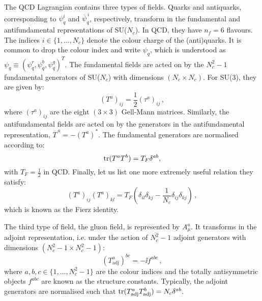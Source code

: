 \documentclass[main.tex]{subfiles}
\begin{document}
The QCD Lagrangian contains three types of fields. Quarks and antiquarks, corresponding to $\psi_q^i$ and $\overline{\psi}_q^{\,i}$, respectively, transform in the fundamental and antifundamental representations of SU($N_c$). In QCD, they have $n_f = 6$ flavours. The indices $i \in \{1,\ldots,N_c\}$ denote the colour charge of the (anti)quarks. It is common to drop the colour index and write $\psi_q$, which is understood as $\psi_q \equiv \left(\psi_q^r, \psi_q^b, \psi_q^g \right)^T$. The fundamental fields are acted on by the $N_c^2-1$ fundamental generators of SU($N_c$) with dimensions $(N_c \times N_c)$. For SU(3), they are given by:
\begin{equation}
    (T^a)_{ij} = \frac{1}{2} (\tau^a)_{ij}\,,
\end{equation}
where $(\tau^a)_{ij}$ are the eight $(3 \times 3)$ Gell-Mann matrices. Similarly, the antifundamental fields are acted on by the generators in the antifundamental representation, $\overline{T}^{\,a} = -\left(T^a\right)^\ast$. The fundamental generators are normalised according to:
\begin{equation}
    \operatorname{\rm tr} (T^aT^b) = T_F \delta^{ab},
\end{equation}
with $T_F = \frac{1}{2}$ in QCD. Finally, let us list one more extremely useful relation they satisfy:
\begin{equation} \label{eq:fierzcolour}
    (T^a)_{ij} (T^a)_{kl} = T_F \left( \delta_{il} \delta_{kj} - \frac{1}{N_c} \delta_{ij} \delta_{kj} \right)\,,
\end{equation}
which is known as the Fierz identity.

The third type of field, the gluon field, is represented by $A^a_\mu$. It transforms in the adjoint representation, i.e. under the action of $N_c^2-1$ adjoint generators with dimensions $(N_c^2-1 \times  N_c^2-1)$:
\begin{equation}
\left(T_\text{adj}^a\right)^{bc} = -\ii f^{abc}\,,
\end{equation}
where $a,b,c \in \{1, \ldots, N_c^2-1\}$ are the colour indices and the totally antisymmetric objects $f^{abc}$ are known as the structure constants. Typically, the adjoint generators are normalised such that $\operatorname{\rm tr} (T_\text{adj}^aT_\text{adj}^b) = N_c \delta^{ab}$. 
\end{document}
